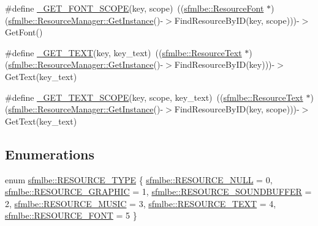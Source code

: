 \begin{DoxyCompactItemize}
\item 
\#define \mbox{\hyperlink{group___t_e_s_t___g_r_o_u_p_gaded42a0ab80920668c19198ecdc5496b}{\+\_\+\+G\+E\+T\+\_\+\+F\+O\+N\+T\+\_\+\+S\+C\+O\+PE}}(key,  scope)~((\mbox{\hyperlink{classsfmlbe_1_1_resource_font}{sfmlbe\+::\+Resource\+Font}} $\ast$)(\mbox{\hyperlink{classsfmlbe_1_1_singleton_a313529b2a097425bf5500df8848ead3e}{sfmlbe\+::\+Resource\+Manager\+::\+Get\+Instance}}()-\/$>$Find\+Resource\+By\+ID(key, scope)))-\/$>$Get\+Font()
\item 
\#define \mbox{\hyperlink{group___t_e_s_t___g_r_o_u_p_gaf75fcb1d120dd3bf410ba5461ffbcce1}{\+\_\+\+G\+E\+T\+\_\+\+T\+E\+XT}}(key,  key\+\_\+text)~((\mbox{\hyperlink{classsfmlbe_1_1_resource_text}{sfmlbe\+::\+Resource\+Text}} $\ast$)(\mbox{\hyperlink{classsfmlbe_1_1_singleton_a313529b2a097425bf5500df8848ead3e}{sfmlbe\+::\+Resource\+Manager\+::\+Get\+Instance}}()-\/$>$Find\+Resource\+By\+ID(key)))-\/$>$Get\+Text(key\+\_\+text)
\item 
\#define \mbox{\hyperlink{group___t_e_s_t___g_r_o_u_p_ga78fc8334e564d9cce24c83511f4b74d2}{\+\_\+\+G\+E\+T\+\_\+\+T\+E\+X\+T\+\_\+\+S\+C\+O\+PE}}(key,  scope,  key\+\_\+text)~((\mbox{\hyperlink{classsfmlbe_1_1_resource_text}{sfmlbe\+::\+Resource\+Text}} $\ast$)(\mbox{\hyperlink{classsfmlbe_1_1_singleton_a313529b2a097425bf5500df8848ead3e}{sfmlbe\+::\+Resource\+Manager\+::\+Get\+Instance}}()-\/$>$Find\+Resource\+By\+ID(key, scope)))-\/$>$Get\+Text(key\+\_\+text)
\end{DoxyCompactItemize}
\subsection*{Enumerations}
\begin{DoxyCompactItemize}
\item 
enum \mbox{\hyperlink{group___t_e_s_t___g_r_o_u_p_gac4335ed3060bba025f73e01f9dccb2dd}{sfmlbe\+::\+R\+E\+S\+O\+U\+R\+C\+E\+\_\+\+T\+Y\+PE}} \{ \newline
\mbox{\hyperlink{group___t_e_s_t___g_r_o_u_p_ggac4335ed3060bba025f73e01f9dccb2dda8d19259bccf0ab6ee075b32fff6f7e54}{sfmlbe\+::\+R\+E\+S\+O\+U\+R\+C\+E\+\_\+\+N\+U\+LL}} = 0, 
\mbox{\hyperlink{group___t_e_s_t___g_r_o_u_p_ggac4335ed3060bba025f73e01f9dccb2dda660c8cdfebf28528f6f0631ae29f89a5}{sfmlbe\+::\+R\+E\+S\+O\+U\+R\+C\+E\+\_\+\+G\+R\+A\+P\+H\+IC}} = 1, 
\mbox{\hyperlink{group___t_e_s_t___g_r_o_u_p_ggac4335ed3060bba025f73e01f9dccb2dda06cb8047cf98a2679b83166ad27d2708}{sfmlbe\+::\+R\+E\+S\+O\+U\+R\+C\+E\+\_\+\+S\+O\+U\+N\+D\+B\+U\+F\+F\+ER}} = 2, 
\mbox{\hyperlink{group___t_e_s_t___g_r_o_u_p_ggac4335ed3060bba025f73e01f9dccb2ddab44bcfdfdfd1fd38857b8ad914608007}{sfmlbe\+::\+R\+E\+S\+O\+U\+R\+C\+E\+\_\+\+M\+U\+S\+IC}} = 3, 
\newline
\mbox{\hyperlink{group___t_e_s_t___g_r_o_u_p_ggac4335ed3060bba025f73e01f9dccb2dda9550a304907119d426805e6ed9a6c193}{sfmlbe\+::\+R\+E\+S\+O\+U\+R\+C\+E\+\_\+\+T\+E\+XT}} = 4, 
\mbox{\hyperlink{group___t_e_s_t___g_r_o_u_p_ggac4335ed3060bba025f73e01f9dccb2dda7eae53eb53c90d3adcdfa9a16ebc34b7}{sfmlbe\+::\+R\+E\+S\+O\+U\+R\+C\+E\+\_\+\+F\+O\+NT}} = 5
 \}
\end{DoxyCompactItemize}


